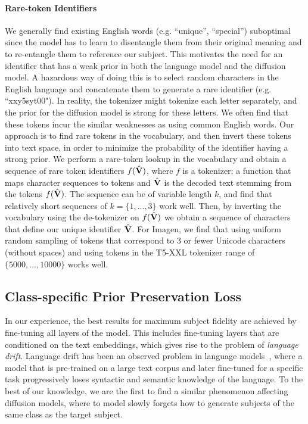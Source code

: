 \paragraph{Rare-token Identifiers}
We generally find existing English words (e.g. ``unique'', ``special'') suboptimal since the model has to learn to disentangle them from their original meaning and to re-entangle them to reference our subject. This motivates the need for an identifier that has a weak prior in both the language model and the diffusion model. A hazardous way of doing this is to select random characters in the English language and concatenate them to generate a rare identifier (e.g. ``xxy5syt00"). In reality, the tokenizer might tokenize each letter separately, and the prior for the diffusion model is strong for these letters. We often find that these tokens incur the similar weaknesses as using common English words.
Our approach is to find rare tokens in the vocabulary, and then invert these tokens into text space, in order to minimize the probability of the identifier having a strong prior. We perform a rare-token lookup in the vocabulary and obtain a sequence of rare token identifiers $f(\hat{\mathbf{V}})$, where $f$ is a tokenizer; a function that maps character sequences to tokens and $\hat{\mathbf{V}}$ is the decoded text stemming from the tokens $f(\hat{\mathbf{V}})$. The sequence can be of variable length $k$, and find that relatively short sequences of $k=\{1, ..., 3\}$ work well. Then, by inverting the vocabulary using the de-tokenizer on $f(\hat{\mathbf{V}})$ we obtain a sequence of characters that define our unique identifier $\hat{\mathbf{V}}$. For Imagen, we find that using uniform random sampling of tokens that correspond to 3 or fewer Unicode characters (without spaces) and using tokens in the T5-XXL tokenizer range of $\{5000, ..., 10000\}$ works well.

\subsection{Class-specific Prior Preservation Loss}
\label{sec:method_prior_pres}
In our experience, the best results for maximum subject fidelity are achieved by fine-tuning all layers of the model. This includes fine-tuning layers that are conditioned on the text embeddings, which gives rise to the problem of \textit{language drift}. Language drift has been an observed problem in language models~\cite{Lee2019CounteringLD,lu2020countering}, where a model that is pre-trained on a large text corpus and later fine-tuned for a specific task progressively loses syntactic and semantic knowledge of the language. To the best of our knowledge, we are the first to find a similar phenomenon affecting diffusion models, where to model slowly forgets how to generate subjects of the same class as the target subject.


